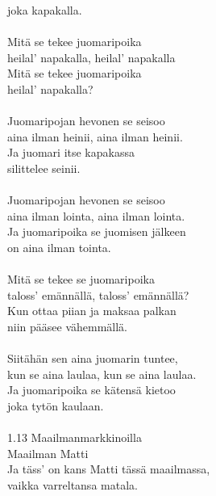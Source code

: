             joka kapakalla. \\
\hspace{10mm} \\
            Mitä se tekee juomaripoika \\
            heilal' napakalla, heilal' napakalla \\
            Mitä se tekee juomaripoika \\
            heilal' napakalla? \\
\hspace{10mm} \\
            Juomaripojan hevonen se seisoo \\
            aina ilman heinii, aina ilman heinii. \\
            Ja juomari itse kapakassa \\
            silittelee seinii. \\
\hspace{10mm} \\
            Juomaripojan hevonen se seisoo \\
            aina ilman lointa, aina ilman lointa. \\
            Ja juomaripoika se juomisen jälkeen \\
            on aina ilman tointa. \\
\hspace{10mm} \\
            Mitä se tekee se juomaripoika \\
            taloss' emännällä, taloss' emännällä? \\
            Kun ottaa piian ja maksaa palkan \\
            niin pääsee vähemmällä. \\
\hspace{10mm} \\
            Siitähän sen aina juomarin tuntee, \\
            kun se aina laulaa, kun se aina laulaa. \\
            Ja juomaripoika se kätensä kietoo \\
            joka tytön kaulaan. \\
\hspace{10mm} \\
1.13 Maailmanmarkkinoilla \\
Maailman Matti \\
            Ja täss' on kans Matti tässä maailmassa, \\
            vaikka varreltansa matala. \\
